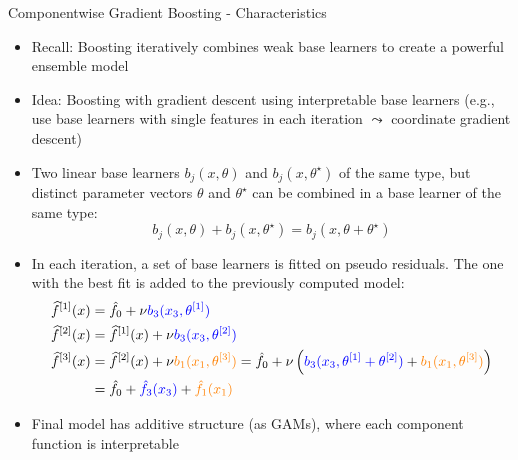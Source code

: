 \documentclass[11pt,compress,t,notes=noshow, aspectratio=169, xcolor=table]{beamer}
\begin{document}
\begin{frame}{Componentwise Gradient Boosting - Characteristics}

\begin{itemize}
\item<1-> Recall: Boosting iteratively combines weak base learners to create a powerful ensemble model
\item<1->
Idea: Boosting with gradient descent using interpretable base learners (e.g., use base learners with single features in each iteration $\leadsto$ coordinate gradient descent)
\item<2->
Two linear base learners $b_j(x, \theta)$ and $b_j(x, \theta^{\star})$ of the same type, but distinct parameter vectors $\theta$ and $\theta^{\star}$ can be combined in a base learner of the same type:
$$b_j(x, \theta) + b_j(x, \theta^{\star}) = b_j(x, \theta + \theta^{\star})$$
\item<3-> In each iteration, a set of base learners is fitted on pseudo residuals. The one with the best fit is added to the previously computed model:
\medskip
\begin{align*}
\widehat{f}^{[1]}(x) &= \hat{f}_0 + \nu \textcolor{blue}{b_3(x_3, \theta^{[1]})} \\
\widehat{f}^{[2]}(x) &= \widehat{f}^{[1]}(x) + \nu \textcolor{blue}{b_3(x_3, \theta^{[2]})} 
\\
\widehat{f}^{[3]}(x) &= \widehat{f}^{[2]}(x) + \nu \textcolor{orange}{b_1(x_1, \theta^{[3]})} 
= \hat{f}_0 + \nu \left(\textcolor{blue}{b_3(x_3, \theta^{[1]} + \theta^{[2]})} + \textcolor{orange}{b_1(x_1, \theta^{[3]})}\right) 
\\
&= \hat{f}_0 + \textcolor{blue}{\hat{f}_3(x_3)} + \textcolor{orange}{\hat{f}_1(x_1)}
\end{align*}
\item<3-> Final model has additive structure (as GAMs), where each component function is interpretable

\end{itemize}
\end{frame}
\end{document}
